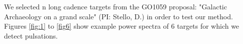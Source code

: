 \documentclass[useAMS, usenatbib]{aastex}
\begin{document}
We selected n long cadence targets from the GO1059 proposal: "Galactic
Archaeology on a grand scale" (PI: Stello, D.) in order to test our method.
Figures \ref{fig:1} to \ref{fig6} show example power spectra of 6 targets for
which we detect pulsations.

\begin{figure}
\begin{center}
\end{center}
\end{figure}
\end{document}
